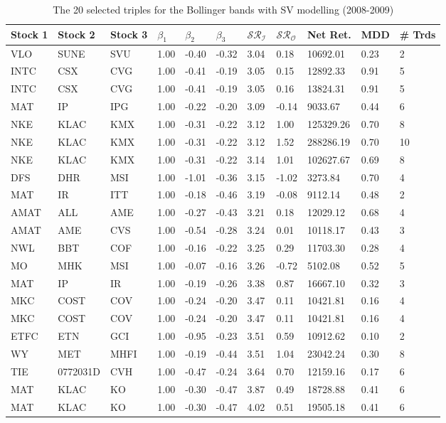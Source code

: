 \documentclass[11pt,a4,twosided,singlespacing,titlepagenumber=on]{scrreprt}
\numberwithin{equation}{chapter} %
\theoremstyle{remark}
\begin{document}
\begin{table}[H]
\centering
\begin{tabular}{lllllllllll}
\hline
Stock 1 & Stock 2 & Stock 3 & $\beta_1$ & $\beta_2$ & $\beta_3$ & $\mathcal{SR}_\mathcal{I}$ & $\mathcal{SR}_\mathcal{O}$ & Net Ret. & MDD & \# Trds\\ \hline
VLO  & SUNE  & SVU  & 1.00 & -0.40 & -0.32 & 3.04 & 0.18 & 10692.01 & 0.23 & 2 \\
INTC  & CSX  & CVG  & 1.00 & -0.41 & -0.19 & 3.05 & 0.15 & 12892.33 & 0.91 & 5 \\
INTC  & CSX  & CVG  & 1.00 & -0.41 & -0.19 & 3.05 & 0.16 & 13824.31 & 0.91 & 5 \\
MAT  & IP  & IPG  & 1.00 & -0.22 & -0.20 & 3.09 & -0.14 & 9033.67 & 0.44 & 6 \\
NKE  & KLAC  & KMX  & 1.00 & -0.31 & -0.22 & 3.12 & 1.00 & 125329.26 & 0.70 & 8 \\
NKE  & KLAC  & KMX  & 1.00 & -0.31 & -0.22 & 3.12 & 1.52 & 288286.19 & 0.70 & 10 \\
NKE  & KLAC  & KMX  & 1.00 & -0.31 & -0.22 & 3.14 & 1.01 & 102627.67 & 0.69 & 8 \\
DFS  & DHR  & MSI  & 1.00 & -1.01 & -0.36 & 3.15 & -1.02 & 3273.84 & 0.70 & 4 \\
MAT  & IR  & ITT  & 1.00 & -0.18 & -0.46 & 3.19 & -0.08 & 9112.14 & 0.48 & 2 \\
AMAT  & ALL  & AME  & 1.00 & -0.27 & -0.43 & 3.21 & 0.18 & 12029.12 & 0.68 & 4 \\
AMAT  & AME  & CVS  & 1.00 & -0.54 & -0.28 & 3.24 & 0.01 & 10118.17 & 0.43 & 3 \\
NWL  & BBT  & COF  & 1.00 & -0.16 & -0.22 & 3.25 & 0.29 & 11703.30 & 0.28 & 4 \\
MO  & MHK  & MSI  & 1.00 & -0.07 & -0.16 & 3.26 & -0.72 & 5102.08 & 0.52 & 5 \\
MAT  & IP  & IR  & 1.00 & -0.19 & -0.26 & 3.38 & 0.87 & 16667.10 & 0.32 & 3 \\
MKC  & COST  & COV  & 1.00 & -0.24 & -0.20 & 3.47 & 0.11 & 10421.81 & 0.16 & 4 \\
MKC  & COST  & COV  & 1.00 & -0.24 & -0.20 & 3.47 & 0.11 & 10421.81 & 0.16 & 4 \\
ETFC  & ETN  & GCI  & 1.00 & -0.95 & -0.23 & 3.51 & 0.59 & 10912.62 & 0.10 & 2 \\
WY  & MET  & MHFI  & 1.00 & -0.19 & -0.44 & 3.51 & 1.04 & 23042.24 & 0.30 & 8 \\
TIE  & 0772031D  & CVH  & 1.00 & -0.47 & -0.24 & 3.64 & 0.70 & 12159.16 & 0.17 & 6 \\
MAT  & KLAC  & KO  & 1.00 & -0.30 & -0.47 & 3.87 & 0.49 & 18728.88 & 0.41 & 6 \\
MAT  & KLAC  & KO  & 1.00 & -0.30 & -0.47 & 4.02 & 0.51 & 19505.18 & 0.41 & 6 \\
\hline
\end{tabular}
\caption{The 20 selected triples for the Bollinger bands with SV modelling (2008-2009)}
\label{20_selected_triples_simple_bands_sv}
\end{table}
\end{document}
